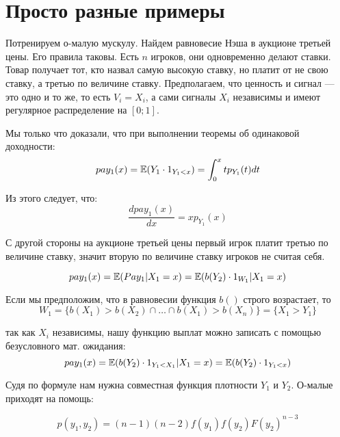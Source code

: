 \section{Просто разные примеры}


\begin{myex} Потренируем о-малую мускулу. Найдем равновесие Нэша в аукционе третьей цены. Его правила таковы. Есть $ n $ игроков, они одновременно делают ставки. Товар получает тот, кто назвал самую высокую ставку, но платит от не свою ставку, а третью по величине ставку. Предполагаем, что ценность и сигнал — это одно и то же, то есть $ V_{i}=X_{i} $, а сами сигналы $ X_{i} $ независимы и имеют регулярное распределение на $ [0;1] $.


Мы только что доказали, что при выполнении теоремы об одинаковой доходности:
\begin{equation}
pay_{1}(x)=\mathbb{E}(Y_{1}\cdot 1_{Y_{1}<x})=\int_{0}^{x}tp_{Y_{1}}(t)dt
\end{equation}

Из этого следует, что:
\begin{equation}
\frac{dpay_{1}(x)}{dx}=xp_{Y_{1}}(x)
\end{equation}


С другой стороны на аукционе третьей цены первый игрок платит третью по величине ставку, значит вторую по величине ставку игроков не считая себя.

\begin{equation}
pay_{1}(x)=\mathbb{E}(Pay_{1}|X_{1}=x)=\mathbb{E}(b(Y_{2})\cdot 1_{W_{1}}|X_{1}=x)
\end{equation}

Если мы предположим, что в равновесии функция $ b() $ строго возрастает, то
\begin{equation}
W_{1}=\{b(X_{1})>b(X_{2})\cap \ldots\cap  b(X_{1})>b(X_{n})\}=\{X_{1}>Y_{1}\}
\end{equation}

так как $ X_{i} $ независимы, нашу функцию выплат можно записать с помощью безусловного мат. ожидания:
\begin{equation}
pay_{1}(x)=\mathbb{E}(b(Y_{2})\cdot 1_{Y_{1}<X_{1}}|X_{1}=x)=\mathbb{E}(b(Y_{2})\cdot 1_{Y_{1}<x})
\end{equation}

Судя по формуле нам нужна совместная функция плотности $ Y_{1} $ и $ Y_{2} $. О-малые приходят на помощь:

\begin{equation}
p(y_{1},y_{2})=(n-1)(n-2)f(y_{1})f(y_{2})F(y_{2})^{n-3}
\end{equation}


\end{myex}
